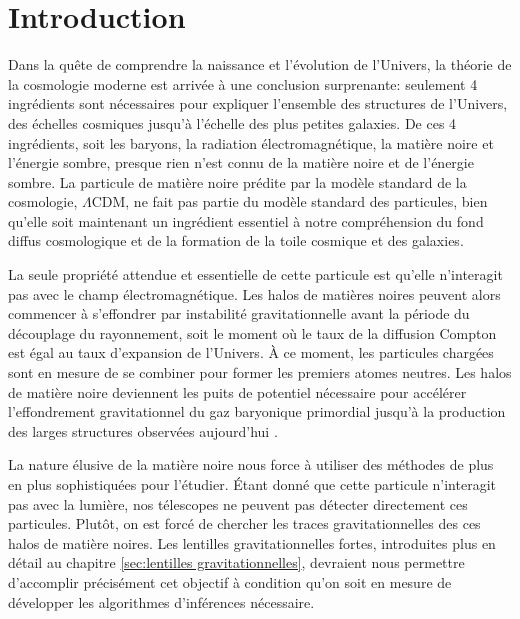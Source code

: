 \chapter{Introduction}\label{chap:intro}
\glsaddall
\thispagestyle{empty}


Dans la quête de comprendre la naissance et l'évolution de l'Univers, la théorie de la cosmologie moderne 
est arrivée à une conclusion surprenante: seulement 4 ingrédients sont nécessaires pour 
expliquer l'ensemble des structures de l'Univers, des échelles cosmiques jusqu'à l'échelle 
des plus petites galaxies. De ces 4 ingrédients, soit les baryons, la radiation électromagnétique, 
la matière noire et l'énergie sombre, presque rien n'est connu de la matière noire et de l'énergie sombre. 
La particule de matière noire prédite par la modèle standard de la cosmologie, $\Lambda$CDM, ne 
fait pas partie du modèle standard des particules, bien qu'elle soit maintenant un ingrédient 
essentiel à notre compréhension du fond diffus cosmologique \citep{PlanckCollaboration2018} 
et de la formation de la toile cosmique et des galaxies.

La seule propriété attendue et essentielle de cette particule est qu'elle n'interagit pas avec le champ 
électromagnétique. Les halos de matières noires peuvent alors commencer à s'effondrer par 
 instabilité gravitationnelle avant la période du 
découplage du rayonnement, soit le moment où le taux de la diffusion Compton est égal au taux d'expansion de l'Univers. 
À ce moment, les particules chargées sont en mesure de se combiner pour former les premiers atomes neutres. 
Les halos de matière noire deviennent les puits de potentiel nécessaire pour accélérer l'effondrement 
gravitationnel du gaz baryonique primordial jusqu'à la production des larges structures observées aujourd'hui \citep{Lucchin2002}.

La nature élusive de la matière noire nous force à utiliser des méthodes de plus en plus sophistiquées 
pour l'étudier. Étant donné que cette particule n'interagit pas avec la lumière, nos télescopes 
ne peuvent pas détecter directement ces particules. Plutôt, on est forcé de chercher les traces 
gravitationnelles des ces halos de matière noires. Les lentilles gravitationnelles fortes, introduites 
plus en détail au chapitre \ref{sec:lentilles gravitationnelles}, devraient nous permettre 
d'accomplir précisément cet objectif à condition qu'on soit en mesure de développer les algorithmes d'inférences 
nécessaire.


